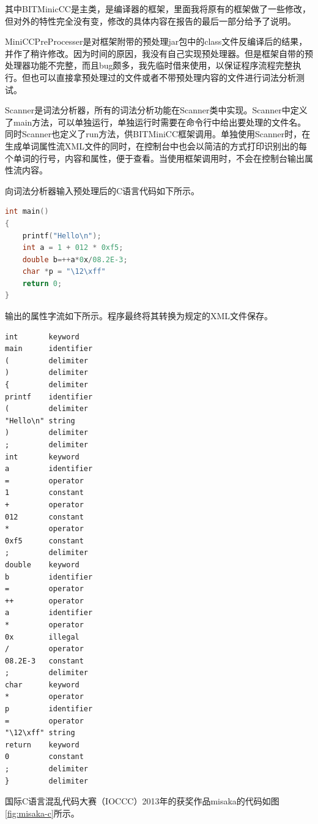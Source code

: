 \documentclass[UTF8, twoside, titlepage]{ctexart}
\begin{document}
其中BITMinicCC是主类，是编译器的框架，里面我将原有的框架做了一些修改，但对外的特性完全没有变，修改的具体内容在报告的最后一部分给予了说明。

MiniCCPreProcesser是对框架附带的预处理jar包中的class文件反编译后的结果，并作了稍许修改。因为时间的原因，我没有自己实现预处理器。但是框架自带的预处理器功能不完整，而且bug颇多，我先临时借来使用，以保证程序流程完整执行。但也可以直接拿预处理过的文件或者不带预处理内容的文件进行词法分析测试。

Scanner是词法分析器，所有的词法分析功能在Scanner类中实现。Scanner中定义了main方法，可以单独运行，单独运行时需要在命令行中给出要处理的文件名。同时Scanner也定义了run方法，供BITMiniCC框架调用。单独使用Scanner时，在生成单词属性流XML文件的同时，在控制台中也会以简洁的方式打印识别出的每个单词的行号，内容和属性，便于查看。当使用框架调用时，不会在控制台输出属性流内容。

向词法分析器输入预处理后的C语言代码如下所示。

\begin{lstlisting}[language=C]
int main()
{
	printf("Hello\n");
	int a = 1 + 012 * 0xf5;
	double b=++a*0x/08.2E-3;
	char *p = "\12\xff"
	return 0;
}
\end{lstlisting}

输出的属性字流如下所示。程序最终将其转换为规定的XML文件保存。

\begin{multicols}{2}
\begin{lstlisting}[xleftmargin=1cm,xrightmargin=1cm]
int       keyword
main      identifier
(         delimiter
)         delimiter
{         delimiter
printf    identifier
(         delimiter
"Hello\n" string
)         delimiter
;         delimiter
int       keyword
a         identifier
=         operator
1         constant
+         operator
012       constant
*         operator
0xf5      constant
;         delimiter
double    keyword
b         identifier
=         operator
++        operator
a         identifier
*         operator
0x        illegal
/         operator
08.2E-3   constant
;         delimiter
char      keyword
*         operator
p         identifier
=         operator
"\12\xff" string
return    keyword
0         constant
;         delimiter
}         delimiter
\end{lstlisting}
\end{multicols}

国际C语言混乱代码大赛（IOCCC）2013年的获奖作品misaka的代码如图\ref{fig:misaka-c}所示。
\end{document}
